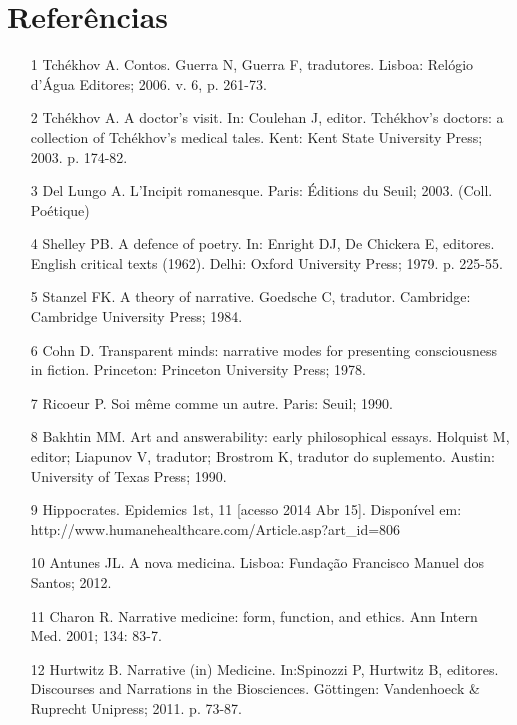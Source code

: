 \documentclass{article}
\begin{document}
\section*{Referências}
\begin{itemize}

\item[1] Tchékhov A. Contos. Guerra N, Guerra F, tradutores. Lisboa: Relógio
d’Água Editores; 2006. v. 6, p. 261-73.

\item[2] Tchékhov A. A doctor’s visit. In: Coulehan J, editor. Tchékhov’s
doctors: a collection of Tchékhov’s medical tales. Kent: Kent State University
Press; 2003. p. 174-82.

\item[3] Del Lungo A. L’Incipit romanesque. Paris: Éditions du Seuil; 2003.
(Coll. Poétique)

\item[4] Shelley PB. A defence of poetry. In: Enright DJ, De Chickera E,
editores. English critical texts (1962). Delhi: Oxford University Press; 1979.
p. 225-55.

\item[5] Stanzel FK. A theory of narrative. Goedsche C, tradutor. Cambridge:
Cambridge University Press; 1984.

\item[6] Cohn D. Transparent minds: narrative modes for presenting consciousness
in fiction. Princeton: Princeton University Press; 1978.

\item[7] Ricoeur P. Soi même comme un autre. Paris: Seuil; 1990.

\item[8] Bakhtin MM. Art and answerability: early philosophical essays. Holquist
M, editor; Liapunov V, tradutor; Brostrom K, tradutor do suplemento. Austin:
University of Texas Press; 1990.

\item[9] Hippocrates. Epidemics 1st, 11 [acesso 2014 Abr 15]. Disponível em:
http://www.humanehealthcare.com/Article.asp?art\_{}id=806

\item[10] Antunes JL. A nova medicina. Lisboa: Fundação Francisco Manuel dos
Santos; 2012.

\item[11] Charon R. Narrative medicine: form, function, and ethics. Ann Intern
Med. 2001; 134: 83-7.

\item[12] Hurtwitz B. Narrative (in) Medicine. In:Spinozzi P, Hurtwitz B,
editores. Discourses and Narrations in the Biosciences. Göttingen: Vandenhoeck
\& Ruprecht Unipress; 2011. p. 73-87.


\end{itemize}
\end{document}
